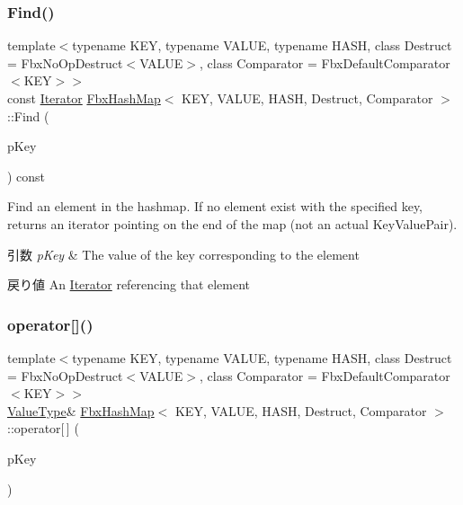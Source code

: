 \subsubsection{\texorpdfstring{Find()}{Find()}}
{\footnotesize\ttfamily template$<$typename K\+EY, typename V\+A\+L\+UE, typename H\+A\+SH, class Destruct = Fbx\+No\+Op\+Destruct$<$\+V\+A\+L\+U\+E$>$, class Comparator = Fbx\+Default\+Comparator$<$\+K\+E\+Y$>$$>$ \\
const \hyperlink{class_fbx_hash_map_1_1_iterator}{Iterator} \hyperlink{class_fbx_hash_map}{Fbx\+Hash\+Map}$<$ K\+EY, V\+A\+L\+UE, H\+A\+SH, Destruct, Comparator $>$\+::Find (\begin{DoxyParamCaption}\item[{const \hyperlink{class_fbx_hash_map_ab56799173b6c58b676a94370b64ddbb0}{Key\+Type} \&}]{p\+Key }\end{DoxyParamCaption}) const}

Find an element in the hashmap. If no element exist with the specified key, returns an iterator pointing on the end of the map (not an actual Key\+Value\+Pair). 
\begin{DoxyParams}{引数}
{\em p\+Key} & The value of the key corresponding to the element \\
\hline
\end{DoxyParams}
\begin{DoxyReturn}{戻り値}
An \hyperlink{class_fbx_hash_map_1_1_iterator}{Iterator} referencing that element 
\end{DoxyReturn}
\mbox{\label{class_fbx_hash_map_a15e7a23bb44c1f0cd21b3b04f84c3fa9}} 
\subsubsection{\texorpdfstring{operator[]()}{operator[]()}}
{\footnotesize\ttfamily template$<$typename K\+EY, typename V\+A\+L\+UE, typename H\+A\+SH, class Destruct = Fbx\+No\+Op\+Destruct$<$\+V\+A\+L\+U\+E$>$, class Comparator = Fbx\+Default\+Comparator$<$\+K\+E\+Y$>$$>$ \\
\hyperlink{class_fbx_hash_map_a9c4cfd0138aa9233c119403f3cc85501}{Value\+Type}\& \hyperlink{class_fbx_hash_map}{Fbx\+Hash\+Map}$<$ K\+EY, V\+A\+L\+UE, H\+A\+SH, Destruct, Comparator $>$\+::operator\mbox{[}$\,$\mbox{]} (\begin{DoxyParamCaption}\item[{const \hyperlink{class_fbx_hash_map_ab56799173b6c58b676a94370b64ddbb0}{Key\+Type} \&}]{p\+Key }\end{DoxyParamCaption})}

